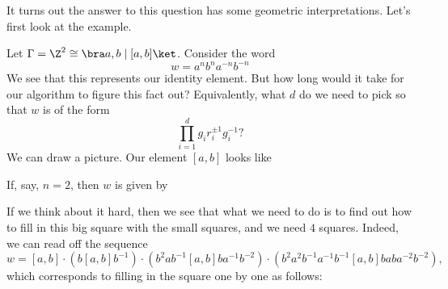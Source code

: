 \documentclass[a4paper]{article}
\begin{document}
It turns out the answer to this question has some geometric interpretations. Let's first look at the example.
\begin{eg}
  Let $\Gamma = \Z^2 \cong \bra a, b \mid [a, b]\ket$. Consider the word
  \[
    w = a^n b^n a^{-n} b^{-n}
  \]
  We see that this represents our identity element. But how long would it take for our algorithm to figure this fact out? Equivalently, what $d$ do we need to pick so that $w$ is of the form
  \[
    \prod_{i = 1}^d g_i r_i^{\pm 1} g_i^{-1}?
  \]
  We can draw a picture. Our element $[a, b]$ looks like
  \begin{center}
  \end{center}
  If, say, $n = 2$, then $w$ is given by
  \begin{center}
  \end{center}
  If we think about it hard, then we see that what we need to do is to find out how to fill in this big square with the small squares, and we need $4$ squares. Indeed, we can read off the sequence
  \[
    w = [a, b] \cdot (b [a, b] b^{-1}) \cdot (b^2 a b^{-1} [a, b] ba^{-1} b^{-2}) \cdot (b^2 a^2 b^{-1}a^{-1}b^{-1}[a, b]baba^{-2}b^{-2}),
  \]
  which corresponds to filling in the square one by one as follows:
  \begin{center}
\end{center}
\end{eg}
\end{document}

